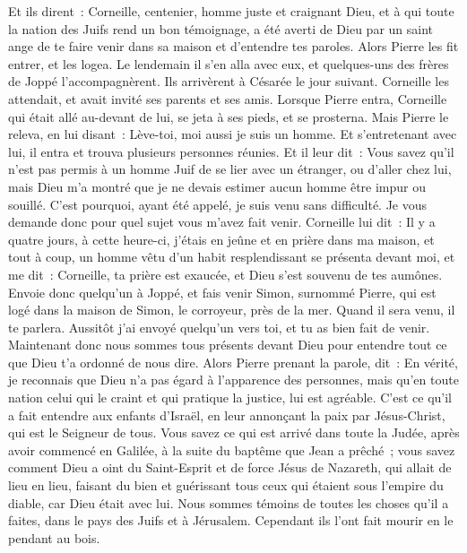 \begin{multicols}{2}
Et ils dirent~: Corneille, centenier, homme juste et craignant Dieu, et à qui toute la nation des Juifs rend un bon témoignage, a été averti de Dieu par un saint ange de te faire venir dans sa maison et d'entendre tes paroles.
Alors Pierre les fit entrer, et les logea. Le lendemain il s'en alla avec eux, et quelques-uns des frères de Joppé l'accompagnèrent.
Ils arrivèrent à Césarée le jour suivant. Corneille les attendait, et avait invité ses parents et ses amis.
Lorsque Pierre entra, Corneille qui était allé au-devant de lui, se jeta à ses pieds, et se prosterna.
Mais Pierre le releva, en lui disant~: Lève-toi, moi aussi je suis un homme.
Et s'entretenant avec lui, il entra et trouva plusieurs personnes réunies.
Et il leur dit~: Vous savez qu'il n'est pas permis à un homme Juif de se lier avec un étranger, ou d'aller chez lui, mais Dieu m'a montré que je ne devais estimer aucun homme être impur ou souillé.
C'est pourquoi, ayant été appelé, je suis venu sans difficulté. Je vous demande donc pour quel sujet vous m'avez fait venir.
Corneille lui dit~: Il y a quatre jours, à cette heure-ci, j'étais en jeûne et en prière dans ma maison, et tout à coup, un homme vêtu d'un habit resplendissant se présenta devant moi, et me dit~:
Corneille, ta prière est exaucée, et Dieu s'est souvenu de tes aumônes.
Envoie donc quelqu'un à Joppé, et fais venir Simon, surnommé Pierre, qui est logé dans la maison de Simon, le corroyeur, près de la mer. Quand il sera venu, il te parlera.
Aussitôt j'ai envoyé quelqu'un vers toi, et tu as bien fait de venir. Maintenant donc nous sommes tous présents devant Dieu pour entendre tout ce que Dieu t'a ordonné de nous dire.
Alors Pierre prenant la parole, dit~: En vérité, je reconnais que Dieu n'a pas égard à l'apparence des personnes,
mais qu'en toute nation celui qui le craint et qui pratique la justice, lui est agréable.
C'est ce qu'il a fait entendre aux enfants d'Israël, en leur annonçant la paix par Jésus-Christ, qui est le Seigneur de tous.
Vous savez ce qui est arrivé dans toute la Judée, après avoir commencé en Galilée, à la suite du baptême que Jean a prêché~;
vous savez comment Dieu a oint du Saint-Esprit et de force Jésus de Nazareth, qui allait de lieu en lieu, faisant du bien et guérissant tous ceux qui étaient sous l'empire du diable, car Dieu était avec lui.
Nous sommes témoins de toutes les choses qu'il a faites, dans le pays des Juifs et à Jérusalem. Cependant ils l'ont fait mourir en le pendant au bois.

\end{multicols}
